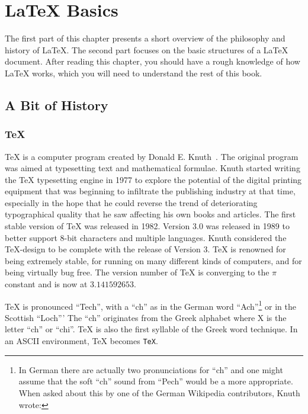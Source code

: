 \chapter{\LaTeX{} Basics}\label{chap:basics}
\begin{intro}
  The first part of this chapter presents a short
  overview of the philosophy and history of \LaTeX. The second part
  focuses on the basic structures of a \LaTeX{} document.
  After reading this chapter, you should have a rough knowledge
  of how \LaTeX{} works, which you will need to understand the rest
  of this book.
\end{intro}

\section{A Bit of History}
\subsection{\TeX}

\TeX{} is a computer program created by Donald E. Knuth~\cite{texbook}. The original program was aimed at typesetting text and
mathematical formulae. Knuth started writing the \TeX{} typesetting engine in
1977 to explore the potential of the digital printing equipment that was
beginning to infiltrate the publishing industry at that time, especially in
the hope that he could reverse the trend of deteriorating typographical
quality that he saw affecting his own books and articles. The first stable
version of \TeX{} was released in 1982. Version 3.0 was released in 1989 to
better support 8-bit characters and multiple languages. Knuth considered the
\TeX-design to be complete with the release of Version 3. \TeX{} is renowned
for being extremely stable, for running on many different kinds of computers,
and for being virtually bug free. The version number of \TeX{} is converging
to the \(\pi\) constant and is now at \(3.141592653\).

\TeX{} is pronounced \enquote{Tech}, with a \enquote{ch} as in the German word
\enquote{Ach}\footnote{In German there are actually two pronunciations for
  \enquote{ch} and one might assume that the soft \enquote{ch} sound from
  \enquote{Pech} would be a more appropriate. When asked about this by one of the
  German Wikipedia contributors, Knuth wrote:
  } or in the
Scottish \enquote{Loch}' The \enquote{ch} originates from the Greek alphabet
where X is the letter \enquote{ch} or \enquote{chi}. \TeX{} is also the first
syllable of the Greek word technique. In an ASCII environment, \TeX{} becomes
\texttt{TeX}.

